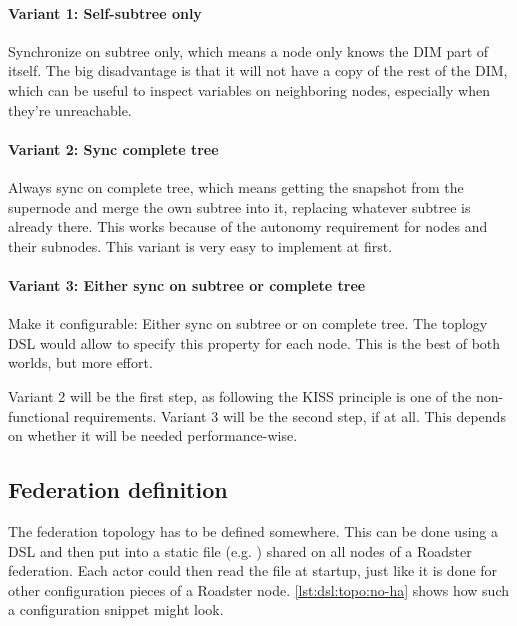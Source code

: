 \paragraph{Variant 1: Self-subtree only}
Synchronize on subtree only, which means a node only knows the DIM part of
itself. The big disadvantage is that it will not have a copy of the rest of the
DIM, which can be useful to inspect variables on neighboring nodes, especially
when they're unreachable.

\paragraph{Variant 2: Sync complete tree}\label{par:approach:dim:var2}
Always sync on complete tree, which means getting the snapshot from the
supernode and merge the own subtree into it, replacing whatever subtree is
already there. This works because of the autonomy requirement for nodes and
their subnodes. This variant is very easy to implement at first.

\paragraph{Variant 3: Either sync on subtree or complete tree}
Make it configurable: Either sync on subtree or on complete tree. The
toplogy DSL would allow to specify this property for each node. This is
the best of both worlds, but more effort.

Variant 2 will be the first step, as following the \gls{KISS} principle is one
of the non-functional requirements. Variant 3 will be the second step, if at
all. This depends on whether it will be needed performance-wise.

\subsection{Federation definition}
The federation topology has to be defined somewhere. This can be done using a
\gls{DSL} and then put into a static file (e.g. ) shared
on all nodes of a Roadster federation. Each actor could then read the file at
startup, just like it is done for other configuration pieces of a Roadster node.
\autoref{lst:dsl:topo:no-ha} shows how such a configuration snippet might look.


